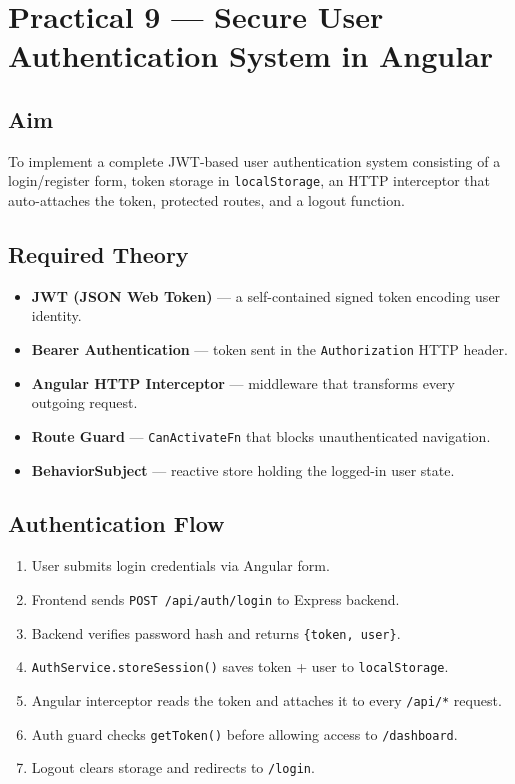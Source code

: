 \documentclass[11pt,a4paper]{article}
\begin{document}
\newpage

\section*{Practical 9 — Secure User Authentication System in Angular}

\subsection*{Aim}
To implement a complete JWT-based user authentication system consisting of a login/register
form, token storage in \texttt{localStorage}, an HTTP interceptor that auto-attaches the token,
protected routes, and a logout function.

\subsection*{Required Theory}
\begin{itemize}
  \item \textbf{JWT (JSON Web Token)} — a self-contained signed token encoding user identity.
  \item \textbf{Bearer Authentication} — token sent in the \texttt{Authorization} HTTP header.
  \item \textbf{Angular HTTP Interceptor} — middleware that transforms every outgoing request.
  \item \textbf{Route Guard} — \texttt{CanActivateFn} that blocks unauthenticated navigation.
  \item \textbf{BehaviorSubject} — reactive store holding the logged-in user state.
\end{itemize}

\subsection*{Authentication Flow}

\begin{enumerate}
  \item User submits login credentials via Angular form.
  \item Frontend sends \texttt{POST /api/auth/login} to Express backend.
  \item Backend verifies password hash and returns \texttt{\{token, user\}}.
  \item \texttt{AuthService.storeSession()} saves token + user to \texttt{localStorage}.
  \item Angular interceptor reads the token and attaches it to every \texttt{/api/*} request.
  \item Auth guard checks \texttt{getToken()} before allowing access to \texttt{/dashboard}.
  \item Logout clears storage and redirects to \texttt{/login}.
\end{enumerate}
\end{document}
